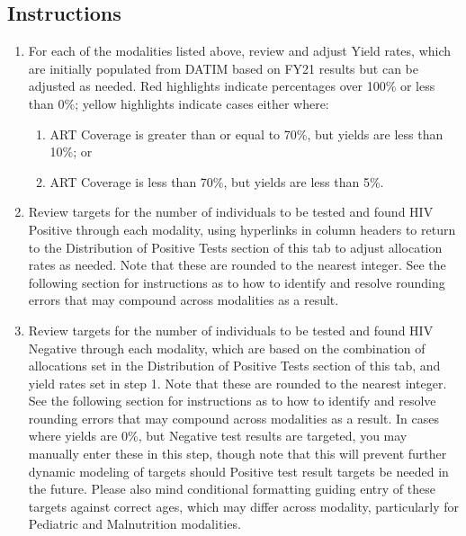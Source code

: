 \documentclass[
  openany]{book}
\begin{document}
\hypertarget{instructions-44}{%
\subsection{Instructions}\label{instructions-44}}

\begin{enumerate}
\def\labelenumi{\arabic{enumi}.}
\item
  For each of the modalities listed above, review and adjust Yield rates, which are initially populated from DATIM based on FY21 results but can be adjusted as needed. Red highlights indicate percentages over 100\% or less than 0\%; yellow highlights indicate cases either where:

  \begin{enumerate}
  \def\labelenumii{\alph{enumii}.}
  \item
    ART Coverage is greater than or equal to 70\%, but yields are less than 10\%; or
  \item
    ART Coverage is less than 70\%, but yields are less than 5\%.
  \end{enumerate}
\item
  Review targets for the number of individuals to be tested and found HIV Positive through each modality, using hyperlinks in column headers to return to the Distribution of Positive Tests section of this tab to adjust allocation rates as needed. Note that these are rounded to the nearest integer. See the following section for instructions as to how to identify and resolve rounding errors that may compound across modalities as a result.
\item
  Review targets for the number of individuals to be tested and found HIV Negative through each modality, which are based on the combination of allocations set in the Distribution of Positive Tests section of this tab, and yield rates set in step 1. Note that these are rounded to the nearest integer. See the following section for instructions as to how to identify and resolve rounding errors that may compound across modalities as a result. In cases where yields are 0\%, but Negative test results are targeted, you may manually enter these in this step, though note that this will prevent further dynamic modeling of targets should Positive test result targets be needed in the future. Please also mind conditional formatting guiding entry of these targets against correct ages, which may differ across modality, particularly for Pediatric and Malnutrition modalities.
\end{enumerate}
\end{document}

